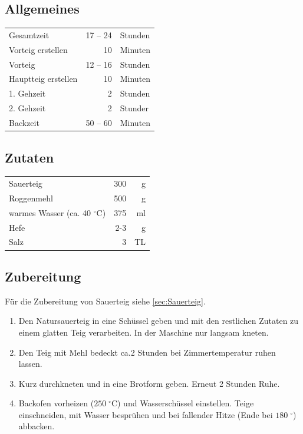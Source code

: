 \subsection*{Allgemeines}
\begin{tabular}{lrl}
	Gesamtzeit          & 17 --  24 & Stunden                        \\
	Vorteig erstellen   &        10 & Minuten                        \\
	Vorteig             &  12 -- 16 & Stunden                        \\
	Hauptteig erstellen &        10 & Minuten                        \\
	1. Gehzeit          &         2 & Stunden                        \\
	2. Gehzeit          &         2 & Stunder                        \\
	Backzeit            &  50 -- 60 & Minuten                        \\
\end{tabular} 
\subsection*{Zutaten}
\begin{tabular}{lrr}
	Sauerteig                        & 300 &  g \\
	Roggenmehl                       & 500 &  g \\
	warmes Wasser (ca. 40 $^\circ$C) & 375 & ml \\
	Hefe                             & 2-3 &  g \\
	Salz                             &   3 & TL
\end{tabular} 


\subsection*{Zubereitung}

Für die Zubereitung von Sauerteig siehe \vref{sec:Sauerteig}.

\begin{enumerate}
	\item Den Natursauerteig in eine Schüssel geben und mit den	restlichen Zutaten zu einem	glatten Teig verarbeiten. In der Maschine nur langsam kneten.
	\item Den Teig mit Mehl bedeckt ca.2 Stunden bei Zimmertemperatur ruhen lassen.	
	\item Kurz durchkneten und in eine Brotform geben. Erneut 2 Stunden Ruhe.
	\item Backofen vorheizen ($ 250\;^{\circ} $C) und Wasserschüssel einstellen. Teige einschneiden, mit Wasser besprühen und bei fallender Hitze (Ende bei $180\;^{\circ}$) abbacken.
\end{enumerate}   

